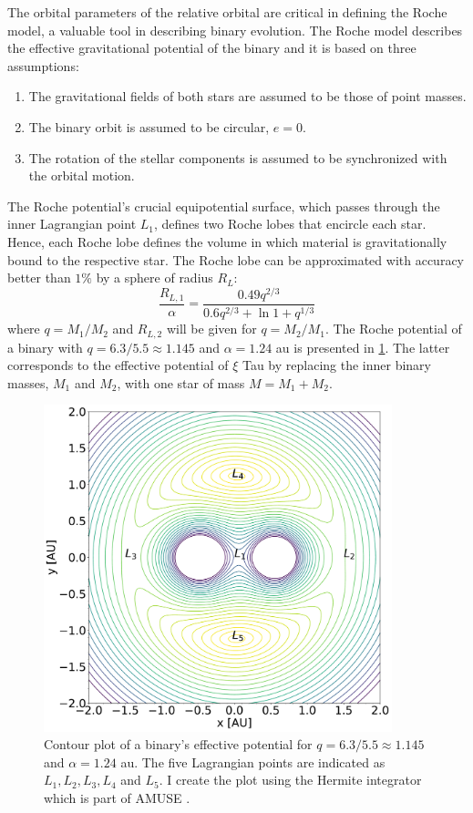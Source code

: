 The orbital parameters of the relative orbital are critical in defining the Roche model, a valuable tool in describing binary evolution. The Roche model describes the effective gravitational potential of the binary and it is based on three assumptions:
\begin{enumerate}
    \item The gravitational fields of both stars are assumed to be those of point masses.
    \item The binary orbit is assumed to be circular, $e=0$.
    \item The rotation of the stellar components is assumed to be synchronized with the orbital motion. 
\end{enumerate}
The Roche potential's crucial equipotential surface, which passes through the inner Lagrangian point $L_1$, defines two Roche lobes that encircle each star. Hence, each Roche lobe defines the volume in which material is gravitationally bound to the respective star. The Roche lobe can be approximated with accuracy better than $1\%$ by a sphere of radius $R_L$:
\begin{equation}\label{eq:roche_lobe}
    \frac{R_{L,1}}{\alpha} = \frac{0.49q^{2/3}}{0.6q^{2/3} + \ln{1+q^{1/3}}}
\end{equation}
where $q =M_1 / M_2$ and $R_{L,2}$ will be given for $q =M_2 / M_1$. The Roche potential of a binary with $q=6.3/5.5 \approx 1.145$ and $\alpha = 1.24$ au is presented in \cref{fig:binary_equop}. The latter corresponds to the effective potential of $\xi$ Tau by replacing the inner binary masses, $M_1$ and $M_2$, with one star of mass $M = M_1 + M_2$.
\begin{figure}[H]
    \centering
    \includegraphics[width=0.9\textwidth]{Thesis/graphs/binary_equop.pdf}
    \caption{Contour plot of a binary's effective potential for $q=6.3/5.5 \approx 1.145$ and $\alpha = 1.24$ au. The five Lagrangian points are indicated as $L_1, L_2, L_3, L_4$ and $L_5$. I create the plot using the Hermite integrator which is part of AMUSE \citep{hut1995building}.}
    \label{fig:binary_equop}
\end{figure}
